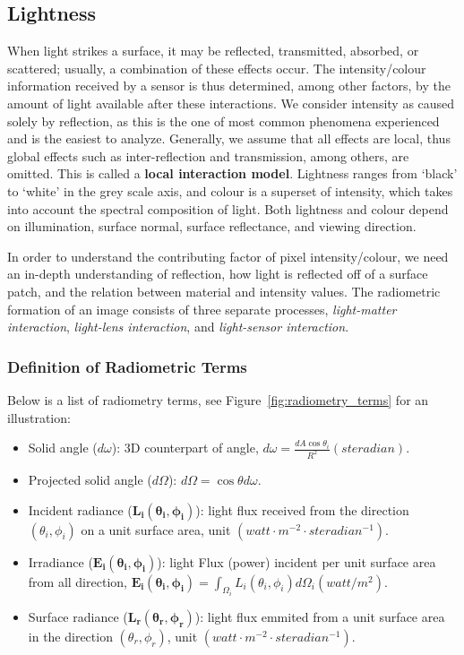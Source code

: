 \subsection{Lightness}
When light strikes a surface, it may be reflected, transmitted, absorbed, or scattered; usually, a combination of these effects occur. The intensity/colour information received by a sensor is thus determined, among other factors, by the amount of light available after these interactions. We consider intensity as caused solely by reflection, as this is the one of most common phenomena experienced and is the easiest to analyze. Generally, we assume that all effects are local, thus global effects such as inter-reflection and transmission, among others, are omitted. This is called a \textbf{local interaction model}. Lightness ranges from `black' to `white' in the grey scale axis, and colour is a superset of intensity, which takes into account the spectral composition of light. Both lightness and colour depend on illumination, surface normal, surface reflectance, and viewing direction.

In order to understand the contributing factor of pixel intensity/colour, we need an in-depth understanding of reflection, \ie how light is reflected off of a surface patch, and the relation between material and intensity values. The radiometric formation of an image consists of three separate processes, \textit{light-matter interaction}, \textit{light-lens interaction}, and \textit{light-sensor interaction}.

\subsubsection{Definition of Radiometric Terms}
Below is a list of radiometry terms, see Figure~\ref{fig:radiometry_terms} for an illustration:
\begin{itemize}
\item Solid angle ($d\omega$): 3D counterpart of angle, $d\omega=\frac{dA \cos\theta_i}{R^2}\mathit{ (steradian)}$.
\item Projected solid angle ($d\Omega$): $d\Omega = \cos\theta d\omega$.
\item Incident radiance ($\mathbf{L_i(\theta_i, \phi_i)}$): light flux received from the direction $(\theta_i, \phi_i)$ on a unit surface area, unit $\mathit{ (watt\cdot m^{-2}\cdot steradian^{-1})}$.
\item Irradiance ($\mathbf{E_i(\theta_i, \phi_i)}$): light Flux (power) incident per unit surface area from all direction, $\mathbf{E_i(\theta_i, \phi_i)}=\int_{\Omega_i} L_i(\theta_i, \phi_i) d\Omega_i \mathit{ (watt/m^2)}$.
\item Surface radiance ($\mathbf{L_r(\theta_r, \phi_r)}$): light flux emmited from a unit surface area in the direction $(\theta_r, \phi_r)$, unit $\mathit{ (watt\cdot m^{-2}\cdot steradian^{-1})}$.
\end{itemize}

